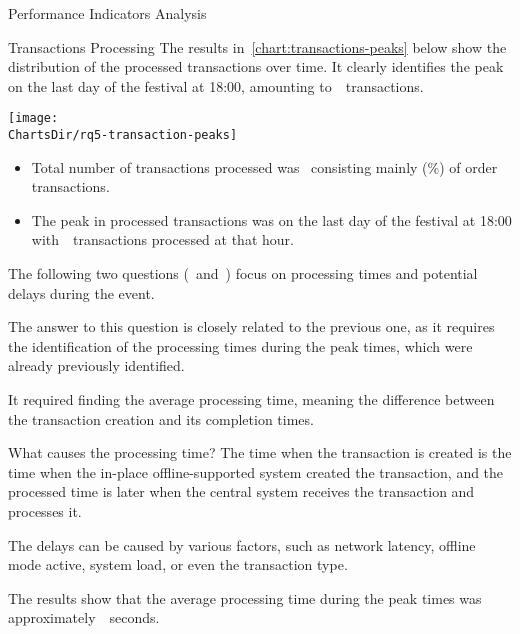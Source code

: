 \begin{section}{Performance Indicators Analysis}
\begin{subsection}{Transactions Processing}
		The results in~\autoref{chart:transactions-peaks} below show the distribution of the processed transactions over time.
		It clearly identifies the peak on the last day of the festival at 18:00, amounting to~~transactions.

		\begin{chart}[H]
			\centering
			\texttt{[image: \\ChartsDir/rq5-transaction-peaks]}
			\caption{ Transactions Peaks}
			\label{chart:transactions-peaks}
			\source
		\end{chart}

		\begin{keytakeaways}
			\begin{itemize}
				\item Total number of transactions processed was~ consisting mainly (\%) of order transactions.
				\item The peak in processed transactions was on the last day of the festival at 18:00 with~~transactions processed at that hour.
			\end{itemize}
		\end{keytakeaways}

		The following two questions (~and~) focus on processing times and potential delays during the event.


		The answer to this question is closely related to the previous one, as it requires the identification of the processing times during the peak times, which were already previously identified.

		It required finding the average processing time, meaning the difference between the transaction creation and its completion times.

		\begin{infobox}{What causes the processing time?}
			The time when the transaction is created is the time when the in-place offline-supported system created the transaction, and the processed time is later when the central system receives the transaction and processes it.

			The delays can be caused by various factors, such as network latency, offline mode active, system load, or even the transaction type.
		\end{infobox}

		The results show that the average processing time during the peak times was approximately~~seconds.


\end{subsection}
\end{section}
